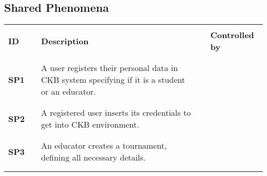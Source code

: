 \subsection{Shared Phenomena}
\renewcommand{\arraystretch}{0.5}
\begin{longtable}[H]{l l p{8.5cm} l l}
    \hline
                   &        &                                                                                                                                   &        &                        \\
    \textbf{ID}    & \vline & \textbf{Description}                                                                                                              & \vline & \textbf{Controlled by} \\
                   &        &                                                                                                                                   &        &                        \\\hline & & \\
    \textbf{SP1}   & \vline & A user registers their personal data in CKB system specifying if it is a student or an educator.                                  & \vline &                        \\
                   &        &                                                                                                                                   &        &                        \\\hline & & \\
    \textbf{SP2}   & \vline & A registered user inserts its credentials to get into CKB environment.                                                            & \vline &                        \\
                   &        &                                                                                                                                   &        &                        \\\hline & & \\
    \textbf{SP3}   & \vline & An educator creates a tournament, defining all necessary details.                                                                 & \vline &                        \\
                   &        &                                                                                                                                   &        &                        \\\hline & & \\

\end{longtable}
